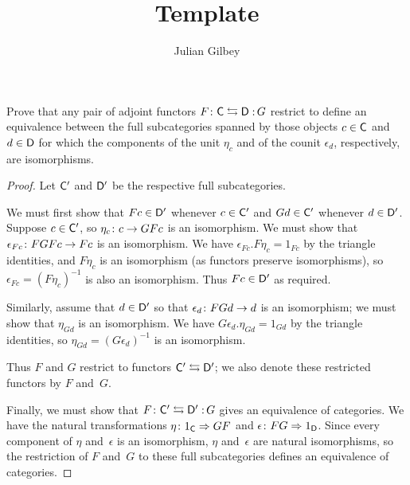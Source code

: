 \documentclass[../../solutions]{subfiles}
\title{Template}
\author{Julian Gilbey}
\begin{document}
\maketitle

%   

\begin{exercise}
  Prove that any pair of adjoint functors $\afunc{F}{G}{\sC}{\sD}$
  restrict to define an equivalence between the full subcategories
  spanned by those objects $c\in\mathsf{C}$ and $d\in\mathsf{D}$ for which the
  components of the unit $\eta_c$ and of the counit $\epsilon_d$,
  respectively, are isomorphisms.
\end{exercise}

\begin{proof}
  Let $\mathsf{C}'$ and $\mathsf{D}'$ be the respective full subcategories.

  We must first show that $Fc\in\mathsf{D}'$ whenever $c\in\mathsf{C}'$ and
  $Gd\in\mathsf{C}'$ whenever $d\in\mathsf{D}'$.  Suppose $c\in\mathsf{C}'$, so
  ${\eta_c}\colon{c}\to{GFc}$ is an isomorphism.  We must show that
  ${\epsilon_{Fc}}\colon{FGFc}\to{Fc}$ is an isomorphism.  We have
  $\epsilon_{Fc}.F\eta_c=1_{Fc}$ by the triangle identities, and
  $F\eta_c$ is an isomorphism (as functors preserve isomorphisms), so
  $\epsilon_{Fc}=(F\eta_c)^{-1}$ is also an isomorphism.  Thus
  $Fc\in\mathsf{D}'$ as required.

  Similarly, assume that $d\in\mathsf{D}'$ so that
  ${\epsilon_d}\colon{FGd}\to{d}$ is an isomorphism; we must show that
  $\eta_{Gd}$ is an isomorphism.  We have
  $G\epsilon_d.\eta_{Gd}=1_{Gd}$ by the triangle identities, so
  $\eta_{Gd}=(G\epsilon_d)^{-1}$ is an isomorphism.

  Thus $F$ and $G$ restrict to functors $\mathsf{C}'\leftrightarrows\mathsf{D}'$; we
  also denote these restricted functors by $F$ and~$G$.

  Finally, we must show that $\afunc{F}{G}{\sC'}{\sD'}$ gives an
  equivalence of categories.  We have the natural transformations
  ${\eta}\colon{1_{\mathsf{C}}}\Rightarrow{GF}$ and ${\epsilon}\colon{FG}\Rightarrow{1_{\mathsf{D}}}$.  Since
  every component of $\eta$ and~$\epsilon$ is an isomorphism, $\eta$
  and~$\epsilon$ are natural isomorphisms, so the restriction of $F$
  and~$G$ to these full subcategories defines an equivalence of
  categories.
\end{proof}
\end{document}
